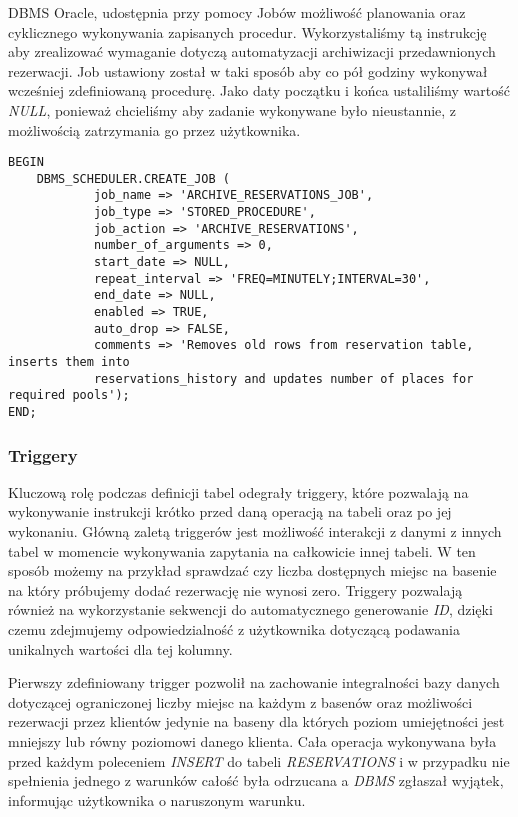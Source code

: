 \documentclass[a4paper]{article}
\begin{document}
DBMS Oracle, udostępnia przy pomocy Jobów możliwość planowania oraz cyklicznego wykonywania zapisanych procedur. Wykorzystaliśmy tą instrukcję aby zrealizować wymaganie dotyczą automatyzacji archiwizacji przedawnionych rezerwacji. Job ustawiony został w taki sposób aby co pół godziny wykonywał wcześniej zdefiniowaną procedurę. Jako daty początku i końca ustaliliśmy wartość \textit{NULL}, ponieważ chcieliśmy aby zadanie wykonywane było nieustannie, z możliwością zatrzymania go przez użytkownika.

\begin{verbatim}
BEGIN
    DBMS_SCHEDULER.CREATE_JOB (
            job_name => 'ARCHIVE_RESERVATIONS_JOB',
            job_type => 'STORED_PROCEDURE',
            job_action => 'ARCHIVE_RESERVATIONS',
            number_of_arguments => 0,
            start_date => NULL,
            repeat_interval => 'FREQ=MINUTELY;INTERVAL=30',
            end_date => NULL,
            enabled => TRUE,
            auto_drop => FALSE,
            comments => 'Removes old rows from reservation table, inserts them into
            reservations_history and updates number of places for required pools');
END;
\end{verbatim}

\subsubsection{Triggery}

Kluczową rolę podczas definicji tabel odegrały triggery, które pozwalają na wykonywanie instrukcji krótko przed daną operacją na tabeli oraz po jej wykonaniu. Główną zaletą triggerów jest możliwość interakcji z danymi z innych tabel w momencie wykonywania zapytania na całkowicie innej tabeli. W ten sposób możemy na przykład sprawdzać czy liczba dostępnych miejsc na basenie na który próbujemy dodać rezerwację nie wynosi zero. Triggery pozwalają również na wykorzystanie sekwencji do automatycznego generowanie \textit{ID}, dzięki czemu zdejmujemy odpowiedzialność z użytkownika dotyczącą podawania unikalnych wartości dla tej kolumny.

Pierwszy zdefiniowany trigger pozwolił na zachowanie integralności bazy danych dotyczącej ograniczonej liczby miejsc na każdym z basenów oraz możliwości rezerwacji przez klientów jedynie na baseny dla których poziom umiejętności jest mniejszy lub równy poziomowi danego klienta. Cała operacja wykonywana była przed każdym poleceniem \textit{INSERT} do tabeli \textit{RESERVATIONS} i w przypadku nie spełnienia jednego z warunków całość była odrzucana a \textit{DBMS} zgłaszał wyjątek, informując użytkownika o naruszonym warunku.
\end{document}
